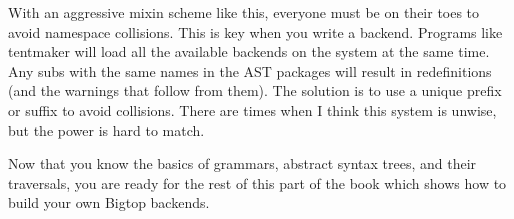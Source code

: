 With an aggressive mixin scheme like this, everyone must be on their toes
to avoid namespace collisions.  This is key when you write a backend.
Programs like tentmaker will load all the available backends on the system
at the same time.  Any subs with the same names in the AST packages will
result in redefinitions (and the warnings that follow from them).  The
solution is to use a unique prefix or suffix to avoid collisions.  There
are times when I think this system is unwise, but the power is hard to match.

Now that you know the basics of grammars, abstract syntax trees, and
their traversals, you are ready for the rest of this part of the book
which shows how to build your own Bigtop backends.

